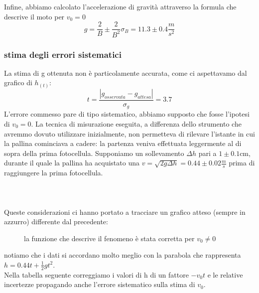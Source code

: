 \documentclass[a4paper]{article}
\theoremstyle{definition}
\begin{document}
\noindent Infine, abbiamo calcolato l'accelerazione di gravità attraverso la formula che descrive il moto per \(v_{0} = 0\) \[g = \frac{2}{B} \pm \frac{2}{B^{2}}\sigma_{B} = 11.3 \pm 0.4 \frac{m}{s^{2}}\]

\subsubsection*{stima degli errori sistematici}
La stima di g ottenuta non è particolamente accurata, come ci aspettavamo dal grafico di \(h_{(t)}\):
\[t= \frac{\left | g_{osservata} - g_{attesa} \right |}{\sigma_{g}} = 3.7\]
 L'errore commesso pare di tipo sistematico, abbiamo supposto che fosse l'ipotesi di \(v_{0} = 0\). La tecnica di misurazione eseguita, a differenza dello strumento che avremmo dovuto utilizzare inizialmente, non permetteva di rilevare l'istante in cui la pallina cominciava a cadere: la partenza veniva effettuata leggermente al di sopra della prima fotocellula. Supponiamo un sollevamento \(\Delta{h}\) pari a \(1 \pm 0.1\)cm, durante il quale la pallina ha acquistato una \(v = \sqrt{2g\Delta{h}} = 0.44 \pm 0.02\frac{m}{s}\) prima di raggiungere la prima fotocellula.\\\\\\\\
Queste considerazioni ci hanno portato a tracciare un grafico atteso (sempre in azzurro) differente dal precedente:






\begin{figure}[!ht]
	\captionsetup{labelformat=empty}
	\caption{la funzione che descrive il fenomeno è stata corretta per \(v_{0}\neq 0\)}
\end{figure}

\noindent notiamo che i dati si accordano molto meglio con la parabola che rappresenta \(h = 0.44t + \frac{1}{2}gt^{2}\).\\
Nella tabella seguente correggiamo i valori di h di un fattore \(-v_{0}t\) e le relative incertezze propagando anche l'errore sistematico sulla stima di \(v_{0}\).
\end{document}
